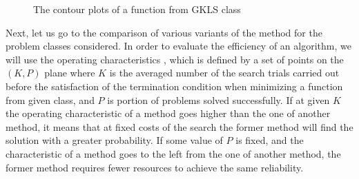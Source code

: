 \documentclass[procedia]{easychair}
\begin{document}
\begin{figure}[ht]
    \centering
    \qquad
    \caption{The contour plots of a function from GKLS class}
    \label{fig:gkls_isolines}
\end{figure}
\par
Next, let us go to the comparison of various variants of the method for the problem
classes considered. In order to evaluate the efficiency of an algorithm, we will use
the operating characteristics \cite{grishaginClass}, which is defined by a set of points on the \((K, P)\)
plane where \(K\) is the averaged number of the search trials carried out before the satisfaction
of the termination condition when minimizing a function from given class, and \(P\)
is portion of problems solved successfully. If at given \(K\) the operating characteristic
of a method goes higher than the one of another method, it means that at fixed costs
of the search the former method will find the solution with a greater probability.
If some value of \(P\) is fixed, and the characteristic of a method goes to the left from
the one of another method, the former method requires fewer resources to achieve the same reliability.
\par
\end{document}
